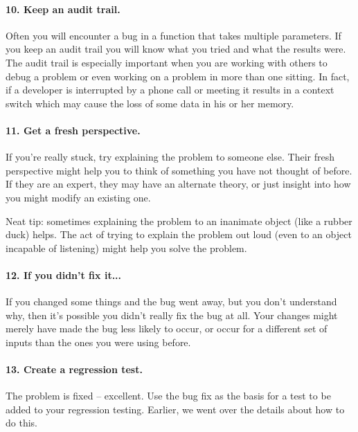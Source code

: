 \paragraph{10. Keep an audit trail.}
Often you will encounter a bug in a function that takes multiple parameters. If you keep an audit trail you will know what you tried and what the results were. The audit trail is especially important when you are working with others to debug a problem or even working on a problem in more than one sitting. In fact, if a developer is interrupted by a phone call or meeting it results in a context switch which may cause the loss of some data in his or her memory.

\paragraph{11. Get a fresh perspective.}
If you're really stuck, try explaining the problem to someone else. Their fresh perspective might help you to think of something you have not thought of before. If they are an expert, they may have an alternate theory, or just insight into how you might modify an existing one.

Neat tip: sometimes explaining the problem to an inanimate object (like a rubber duck) helps. The act of trying to explain the problem out loud (even to an object incapable of listening) might help you solve the problem.

\paragraph{12. If you didn't fix it...}
If you changed some things and the bug went away, but you don't understand why, then it's possible you didn't really fix the bug at all. Your changes might merely have made the bug less likely to occur, or occur for a different set of inputs than the ones you were using before.

\paragraph{13. Create a regression test.}
The problem is fixed -- excellent. Use the bug fix as the basis for a test to be added to your regression testing. Earlier, we went over the details about how to do this.






